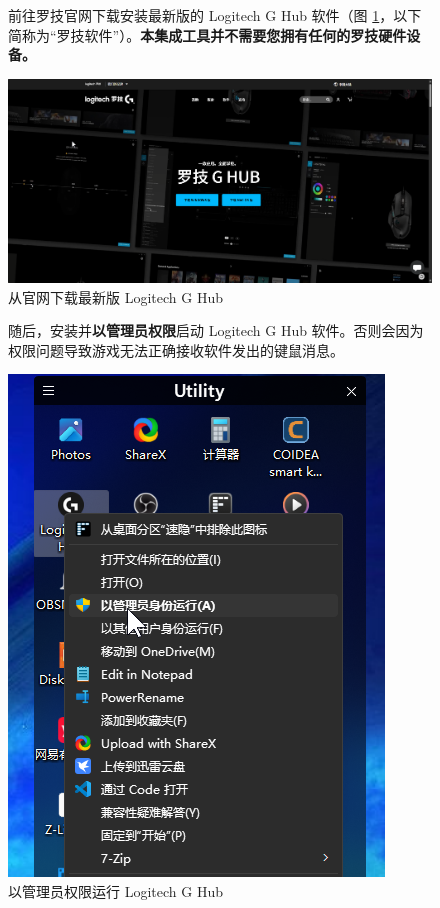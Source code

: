 \begin{figure}[H]
    \Centering
    \parbox[l]{\textwidth}{前往罗技官网下载安装最新版的 Logitech G Hub 软件（图 \ref{ch0fig-download-lghub}，以下简称为“罗技软件”）。\textbf{\color{red}本集成工具并不需要您拥有任何的罗技硬件设备。}}
    \includegraphics[width=\textwidth]{assets/intro/download-lghub.png}
    \caption{从官网下载最新版 Logitech G Hub}
    \label{ch0fig-download-lghub}
\end{figure}

\begin{figure}[H]
    \Centering
    \parbox[l]{\textwidth}{随后，安装并\textbf{\color{red}以管理员权限}启动 Logitech G Hub 软件。否则会因为权限问题导致游戏无法正确接收软件发出的键鼠消息。}
    \includegraphics[width=\textwidth]{assets/intro/run_lghub.png}
    \caption{以管理员权限运行 Logitech G Hub}
\end{figure}

